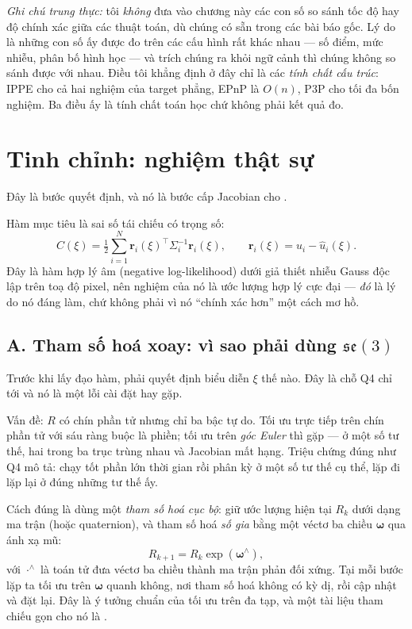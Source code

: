 \documentclass[../../marker.tex]{subfiles}
\begin{document}
\emph{Ghi chú trung thực:} tôi \emph{không} đưa vào chương này các con số so sánh tốc độ hay độ chính xác giữa các thuật toán, dù chúng có sẵn trong các bài báo gốc. Lý do là những con số ấy được đo trên các cấu hình rất khác nhau --- số điểm, mức nhiễu, phân bố hình học --- và trích chúng ra khỏi ngữ cảnh thì chúng không so sánh được với nhau. Điều tôi khẳng định ở đây chỉ là các \emph{tính chất cấu trúc}: IPPE cho cả hai nghiệm của target phẳng, EPnP là \(O(n)\), P3P cho tối đa bốn nghiệm. Ba điều ấy là tính chất toán học chứ không phải kết quả đo.

\section{Tinh chỉnh: nghiệm thật sự}

Đây là bước quyết định, và nó là bước cấp Jacobian cho .

Hàm mục tiêu là sai số tái chiếu có trọng số:
\begin{equation}
C(\xi) = \tfrac{1}{2}\sum_{i=1}^{N} \mathbf{r}_i(\xi)^\top \Sigma_i^{-1} \mathbf{r}_i(\xi),
\qquad
\mathbf{r}_i(\xi) = u_i - \hat{u}_i(\xi).
\label{eq:a03-cost}
\end{equation}
Đây là hàm hợp lý âm (negative log-likelihood) dưới giả thiết nhiễu Gauss độc lập trên toạ độ pixel, nên nghiệm của nó là ước lượng hợp lý cực đại --- \emph{đó} là lý do nó đáng làm, chứ không phải vì nó ``chính xác hơn'' một cách mơ hồ.

\subsection{A. Tham số hoá xoay: vì sao phải dùng \texorpdfstring{\(\mathfrak{se}(3)\)}{se(3)}}

Trước khi lấy đạo hàm, phải quyết định biểu diễn \(\xi\) thế nào. Đây là chỗ Q4 chỉ tới và nó là một lỗi cài đặt hay gặp.

Vấn đề: \(R\) có chín phần tử nhưng chỉ ba bậc tự do. Tối ưu trực tiếp trên chín phần tử với sáu ràng buộc là phiền; tối ưu trên \emph{góc Euler} thì gặp  --- ở một số tư thế, hai trong ba trục trùng nhau và Jacobian mất hạng. Triệu chứng đúng như Q4 mô tả: chạy tốt phần lớn thời gian rồi phân kỳ ở một số tư thế cụ thể, lặp đi lặp lại ở đúng những tư thế ấy.

Cách đúng là dùng một \emph{tham số hoá cục bộ}: giữ ước lượng hiện tại \(R_k\) dưới dạng ma trận (hoặc quaternion), và tham số hoá \emph{số gia} bằng một véctơ ba chiều \(\boldsymbol{\omega}\) qua ánh xạ mũ:
\[
R_{k+1} = R_k \exp(\boldsymbol{\omega}^\wedge),
\]
với \(\cdot^\wedge\) là toán tử đưa véctơ ba chiều thành ma trận phản đối xứng. Tại mỗi bước lặp ta tối ưu trên \(\boldsymbol{\omega}\) quanh không, nơi tham số hoá không có kỳ dị, rồi cập nhật và đặt lại. Đây là ý tưởng chuẩn của tối ưu trên đa tạp, và một tài liệu tham chiếu gọn cho nó là \cite{sola2018microlie}.
\end{document}
